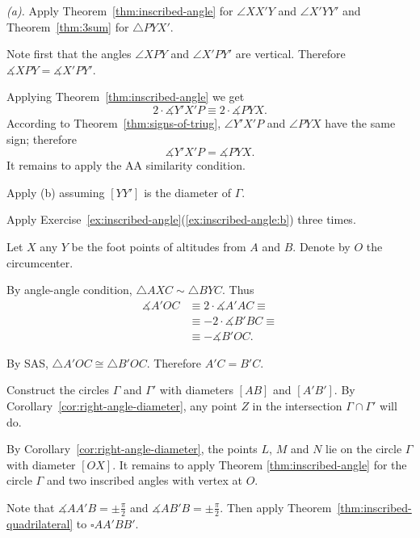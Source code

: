  \textit{(a).}
Apply Theorem~\ref{thm:inscribed-angle} for $\angle XX'Y$ and $\angle X'YY'$
and Theorem~\ref{thm:3sum} for $\triangle PYX'$.

 Note first that the angles $\angle XPY$ and $\angle X'PY'$ are vertical.
Therefore $\measuredangle XPY=\measuredangle X'PY'$.

Applying Theorem~\ref{thm:inscribed-angle} we get
$$2\cdot \measuredangle Y'X'P\equiv 2\cdot\measuredangle PYX.$$
According to Theorem~\ref{thm:signs-of-triug}, $\angle Y'X'P$ and $\angle PYX$ have the same sign;
therefore
$$\measuredangle Y'X'P= \measuredangle PYX.$$
It remains to apply the AA similarity condition.

 Apply (b) assuming $[YY']$ is the diameter of $\Gamma$. 

 Apply Exercise~\ref{ex:inscribed-angle}(\ref{ex:inscribed-angle:b})
three times.

Let $X$ any $Y$ be the foot points of altitudes from $A$ and $B$.
Denote by $O$ the circumcenter.
 
By angle-angle condition, $\triangle A X C\sim \triangle B Y C$.
Thus 
\begin{align*}
\measuredangle A'OC
&\equiv 
2\cdot \measuredangle A' A C
\equiv
\\
&\equiv-2\cdot\measuredangle B' B C\equiv
\\
&\equiv-\measuredangle B'OC.
\end{align*}


By SAS, $\triangle A'OC\cong\triangle B'OC$.
Therefore $A'C=B'C$.

Construct the circles $\Gamma$ and $\Gamma'$
with diameters $[AB]$ and $[A'B']$.
By Corollary~\ref{cor:right-angle-diameter},
any point $Z$ in the intersection $\Gamma\cap \Gamma'$ will do.

By Corollary~\ref{cor:right-angle-diameter},
the points $L$, $M$ and $N$ lie on the circle $\Gamma$ with diameter $[OX]$.
It remains to apply Theorem \ref{thm:inscribed-angle} for the circle $\Gamma$ 
and two inscribed angles with vertex at $O$.

Note that $\measuredangle AA'B=\pm\tfrac\pi2$ and $\measuredangle AB'B=\pm\tfrac\pi2$.
Then apply Theorem~\ref{thm:inscribed-quadrilateral}
to $\square AA'BB'$.

